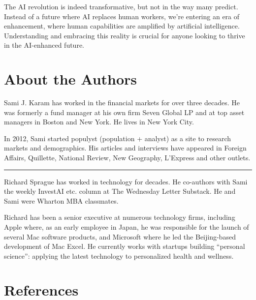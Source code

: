 \documentclass[
  Letterpaper,
]{scrbook}
\begin{document}
The AI revolution is indeed transformative, but not in the way many
predict. Instead of a future where AI replaces human workers, we're
entering an era of enhancement, where human capabilities are amplified
by artificial intelligence. Understanding and embracing this reality is
crucial for anyone looking to thrive in the AI-enhanced future.


\chapter*{About the Authors}\label{about-the-authors}


Sami J. Karam has worked in the financial markets for over three
decades. He was formerly a fund manager at his own firm Seven Global LP
and at top asset managers in Boston and New York. He lives in New York
City.

In 2012, Sami started populyst (population + analyst) as a site to
research markets and demographics. His articles and interviews have
appeared in Foreign Affairs, Quillette, National Review, New Geography,
L'Express and other outlets.

\begin{center}\rule{0.5\linewidth}{0.5pt}\end{center}

Richard Sprague has worked in technology for decades. He co-authors with
Sami the weekly InvestAI etc. column at The Wednesday Letter Substack.
He and Sami were Wharton MBA classmates.

Richard has been a senior executive at numerous technology firms,
including Apple where, as an early employee in Japan, he was responsible
for the launch of several Mac software products, and
Microsoft where he led the Beijing-based
development of Mac Excel. He currently works with startups building
``personal science'': applying the latest technology to personalized
health and wellness.


\chapter*{References}\label{references}

\end{document}
